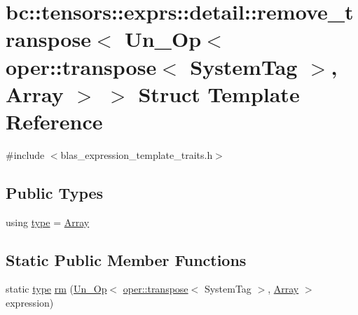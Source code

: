 \hypertarget{structbc_1_1tensors_1_1exprs_1_1detail_1_1remove__transpose_3_01Un__Op_3_01oper_1_1transpose_3_0108540817e9a89440300c45967e20325}{}\section{bc\+:\+:tensors\+:\+:exprs\+:\+:detail\+:\+:remove\+\_\+transpose$<$ Un\+\_\+\+Op$<$ oper\+:\+:transpose$<$ System\+Tag $>$, Array $>$ $>$ Struct Template Reference}
\label{structbc_1_1tensors_1_1exprs_1_1detail_1_1remove__transpose_3_01Un__Op_3_01oper_1_1transpose_3_0108540817e9a89440300c45967e20325}


{\ttfamily \#include $<$blas\+\_\+expression\+\_\+template\+\_\+traits.\+h$>$}

\subsection*{Public Types}
\begin{DoxyCompactItemize}
\item 
using \hyperlink{structbc_1_1tensors_1_1exprs_1_1detail_1_1remove__transpose_3_01Un__Op_3_01oper_1_1transpose_3_0108540817e9a89440300c45967e20325_a521fa80fb0c4e801cfb8737883703a82}{type} = \hyperlink{structbc_1_1tensors_1_1exprs_1_1Array}{Array}
\end{DoxyCompactItemize}
\subsection*{Static Public Member Functions}
\begin{DoxyCompactItemize}
\item 
static \hyperlink{structbc_1_1tensors_1_1exprs_1_1detail_1_1remove__transpose_3_01Un__Op_3_01oper_1_1transpose_3_0108540817e9a89440300c45967e20325_a521fa80fb0c4e801cfb8737883703a82}{type} \hyperlink{structbc_1_1tensors_1_1exprs_1_1detail_1_1remove__transpose_3_01Un__Op_3_01oper_1_1transpose_3_0108540817e9a89440300c45967e20325_a5a7fe50844a25ca22bc909d6a5614e49}{rm} (\hyperlink{structbc_1_1tensors_1_1exprs_1_1Un__Op}{Un\+\_\+\+Op}$<$ \hyperlink{structbc_1_1oper_1_1transpose}{oper\+::transpose}$<$ System\+Tag $>$, \hyperlink{structbc_1_1tensors_1_1exprs_1_1Array}{Array} $>$ expression)
\end{DoxyCompactItemize}


